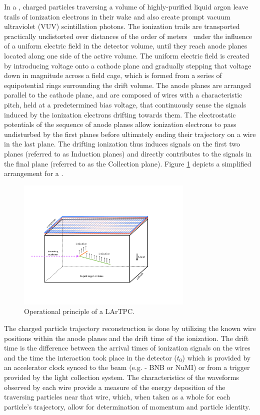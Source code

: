 In a \lartpc, charged particles traversing a volume of highly-purified liquid argon leave trails of ionization electrons in their wake and also create prompt vacuum ultraviolet (VUV) scintillation photons.  The ionization trails are transported practically undistorted over distances of the order of meters~\cite{Aprile:1985} under the influence of a uniform electric field in the detector volume, until they reach anode planes located along one side of the active volume.   The uniform electric field is created by introducing voltage onto a cathode plane and gradually stepping that voltage down in magnitude across a field cage, which is formed from a series of equipotential rings surrounding the drift volume.  The anode planes are arranged parallel to the cathode plane, and are composed of wires with a characteristic pitch, held at a predetermined bias voltage, that continuously sense the signals induced by the ionization electrons drifting towards them. The electrostatic potentials of the sequence of anode planes allow ionization electrons to pass undisturbed by the first planes before ultimately ending their trajectory on a wire in the last plane. The drifting ionization thus induces signals on the first two planes (referred to as Induction planes) and directly contributes to the signals in the final plane (referred to as the Collection plane).  Figure \ref{fig:lartpc} depicts a simplified arrangement for a \lartpc.  

\begin{figure}
\centering 
\includegraphics[width=0.75\textwidth]{figures/my_tpc}
\caption{Operational principle of a LArTPC.}
\label{fig:lartpc}
\end{figure}


The charged particle trajectory reconstruction is done by utilizing the known wire positions within the anode planes and the drift time of the ionization.  The drift time is the difference between the arrival times of ionization signals on the wires and the time the interaction took place in the detector ($t_0$) which is provided by an accelerator clock synced to the beam (e.g. - BNB or NuMI) or from a trigger provided by the light collection system.  The characteristics of the waveforms observed by each wire provide a measure of the energy deposition of the traversing particles near that wire, which, when taken as a whole for each particle's trajectory, allow for determination of momentum and particle identity. 


